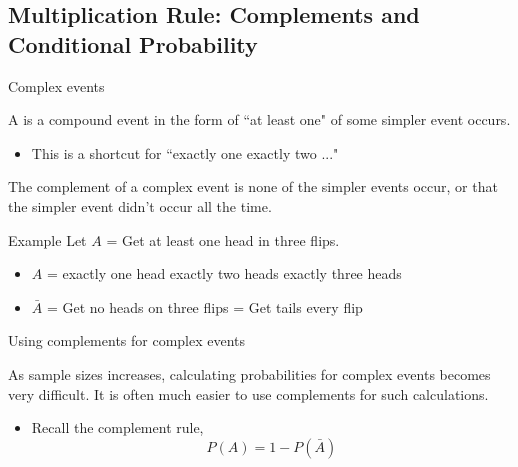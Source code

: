 \documentclass[xcolor=table, handout]{beamer}
\begin{document}
\subsection{Multiplication Rule: Complements and Conditional Probability}

\begin{frame}{Complex events}

\begin{block}{}
{\large A  is a compound event in the form of ``at least one" of some simpler event occurs.}
\begin{itemize}
\pause
\item This is a shortcut for ``exactly one  exactly two ..."
\end{itemize}
\end{block}

\pause

\begin{block}{}
The complement of a complex event is none of the simpler events occur, or that the simpler event didn't occur all the time.
\end{block}

\begin{exampleblock}{Example}
Let $A$ = Get at least one head in three flips.
\begin{itemize}
\pause
\item $A$ = exactly one head  exactly two heads  exactly three heads
\pause
\item $\bar A$ = Get no heads on three flips = Get tails every flip
\end{itemize}
\end{exampleblock}
\end{frame}

\begin{frame}{Using complements for complex events}
\begin{block}{}
As sample sizes increases, calculating probabilities for complex events becomes very difficult. It is often much easier to use complements for such calculations.

\begin{itemize}
\item Recall the complement rule,
\[P(A) = 1 - P(\bar A)\]
\end{itemize}
\end{block}
\end{frame}
\end{document}
